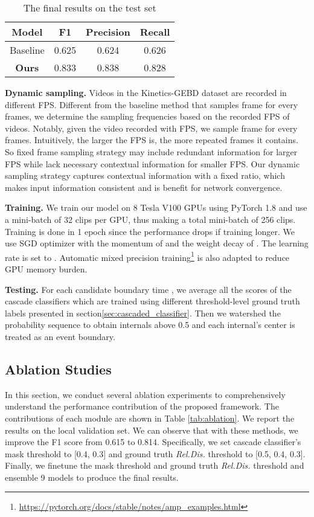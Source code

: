 \documentclass[final]{cvpr}
\begin{document}
\begin{table}[!t]
    \centering
    \begin{tabular}{c c c c}
    \toprule[1.2pt]
        Model & F1 & Precision & Recall \\
    \hline
        Baseline\cite{DBLP:journals/corr/GEBD_dataset} & 0.625 & 0.624 & 0.626 \\
        \textbf{Ours} & 0.833 & 0.838 & 0.828 \\
    \bottomrule[1.2pt]
    \end{tabular}
    \caption{The final results on the test set}
    \label{tab:final}
\end{table}


\textbf{Dynamic sampling.} Videos in the Kinetics-GEBD dataset are recorded in different FPS. Different from the baseline method that samples  frame for every  frames, we determine the sampling frequencies based on the recorded FPS of videos. Notably, given the video recorded with  FPS, we sample  frame for every  frames. Intuitively, the larger the FPS is, the more repeated frames it contains. So fixed frame sampling strategy may include redundant information for larger FPS while lack necessary contextual information for smaller FPS. Our dynamic sampling strategy captures contextual information with a fixed ratio, which makes input information consistent and is benefit for network convergence.

\textbf{Training.} We train our model on 8 Tesla V100 GPUs using PyTorch 1.8 and use a mini-batch of 32 clips per GPU, thus making a total mini-batch of 256 clips. Training is done in 1 epoch since the performance drops if training longer.  We use SGD optimizer with the momentum of  and the weight decay of . The learning rate is set to . Automatic mixed precision training\footnote{\url{https://pytorch.org/docs/stable/notes/amp_examples.html}} is also adapted to reduce GPU memory burden.

\textbf{Testing.} For each candidate boundary time , we average all the scores of the cascade classifiers which are trained using different threshold-level ground truth labels presented in section\ref{sec:cascaded_classifier}. Then we watershed the probability sequence to obtain internals above 0.5 and each internal’s center is treated as an event boundary.

\subsection{Ablation Studies}
In this section, we conduct several ablation experiments to comprehensively understand the performance contribution of the proposed framework. The contributions of each module are shown in Table \ref{tab:ablation}. We report the results on the local validation set. We can observe that with these methods, we improve the F1 score from 0.615 to 0.814. Specifically, we set cascade classifier's mask threshold  to [0.4, 0.3] and ground truth \textit{Rel.Dis.} threshold  to [0.5, 0.4, 0.3]. Finally, we finetune the mask threshold and ground truth \textit{Rel.Dis.} threshold and ensemble 9 models to produce the final results.
\end{document}

